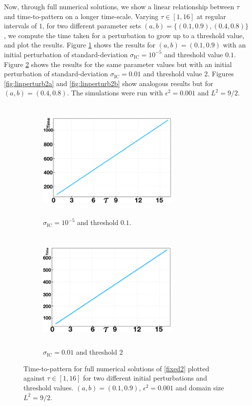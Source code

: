 Now, through full numerical solutions, we show a linear relationship between $\tau$ and time-to-pattern on a longer time-scale. Varying $\tau\in[1,16]$ at regular intervals of $1$, for two different parameter sets $(a,b)=\{(0.1,0.9),(0.4,0.8)\}$, we compute the time taken for a perturbation to grow up to a threshold value, and plot the results. Figure \ref{fig:linperturb1a} shows the results for $(a,b)=(0.1,0.9)$ with an initial perturbation of standard-deviation $\sigma_{\text{IC}}=10^{-5}$ and threshold value $0.1$. Figure \ref{fig:linperturb1b} shows the results for the same parameter values but with an initial perturbation of standard-deviation $\sigma_{\text{IC}}=0.01$ and threshold value $2$. Figures \ref{fig:linperturb2a} and \ref{fig:linperturb2b} show analogous results but for $(a,b)=(0.4,0.8)$. The simulations were run with $\epsilon^2=0.001$ and $L^2=9/2$.
\begin{figure}[H]
    \centering
    \begin{subfigure}[b]{0.45\textwidth}
        \centering
        \includegraphics[width=7cm,height=6cm]{longlin2.png}
        \caption{$\sigma_{\text{IC}}=10^{-5}$ and threshold $0.1$.}
        \label{fig:linperturb1a}
    \end{subfigure}
    \hfill
    \begin{subfigure}[b]{0.45\textwidth}
        \centering
        \includegraphics[width=7cm,height=6cm]{longlin1.png}
        \caption{$\sigma_{\text{IC}}=0.01$ and threshold $2$}
        \label{fig:linperturb1b}
    \end{subfigure}
    \caption{Time-to-pattern for full numerical solutions of \eqref{fixed2} plotted against $\tau\in[1,16]$ for two different initial perturbations and threshold values. $(a,b)=(0.1,0.9)$, $\epsilon^2=0.001$ and domain size $L^2=9/2$.}
    \label{fig:linperturb1}
\end{figure}

